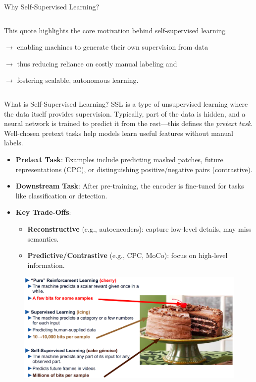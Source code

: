 \begin{frame}[allowframebreaks]{Why Self-Supervised Learning?}
\begin{columns}
\begin{column}{0.4\textwidth}
        \vspace{1em}

        \small
        This quote highlights the core motivation behind self-supervised learning
        
        $\rightarrow$ enabling machines to generate their own supervision from data

        $\rightarrow$ thus reducing reliance on costly manual labeling and
        
        $\rightarrow$ fostering scalable, autonomous learning.
    \end{column}
    \end{columns} 
\end{frame}

\begin{frame}[allowframebreaks]{What is Self-Supervised Learning?}
    SSL is a type of unsupervised learning where the data itself provides supervision. Typically, part of the data is hidden, and a neural network is trained to predict it from the rest—this defines the \textit{pretext task}. Well-chosen pretext tasks help models learn useful features without manual labels.

    \begin{itemize}
        \item \textbf{Pretext Task}: Examples include predicting masked patches, future representations (CPC), or distinguishing positive/negative pairs (contrastive).
        \item \textbf{Downstream Task}: After pre-training, the encoder is fine-tuned for tasks like classification or detection.
        \item \textbf{Key Trade-Offs}:
        \begin{itemize}
            \item \textbf{Reconstructive} (e.g., autoencoders): capture low-level details, may miss semantics.
            \item \textbf{Predictive/Contrastive} (e.g., CPC, MoCo): focus on high-level information.
        \end{itemize}
    \end{itemize}

    \framebreak

    \begin{figure}
        \centering
        \includegraphics[width=\linewidth,height=\textheight,keepaspectratio]{images/ssl/slide_10_1_img.png}
    \end{figure}

\end{frame}